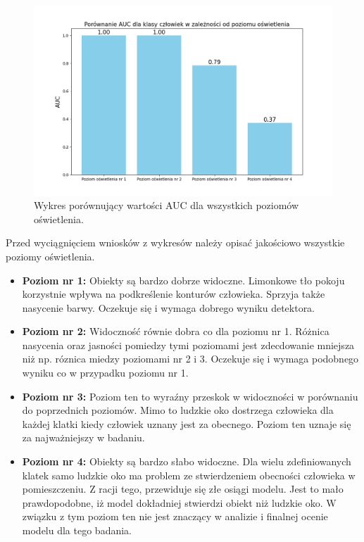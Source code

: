 \begin{figure}[H]
    \centering
    \includegraphics[width=\linewidth]{r_test_dokładności/AUC_charts/porownanieAUC.png}
    \caption{Wykres porównujący wartości AUC dla wszystkich poziomów oświetlenia.}
    \label{fig:AUC}
\end{figure}

Przed wyciągnięciem wniosków z wykresów należy opisać jakościowo wszystkie poziomy oświetlenia. 
\begin{itemize}
    \item \textbf{Poziom nr 1:} Obiekty są bardzo dobrze widoczne. Limonkowe tło pokoju korzystnie wpływa na podkreślenie konturów człowieka. Sprzyja także nasycenie barwy. Oczekuje się i wymaga dobrego wyniku detektora. 
    \item \textbf{Poziom nr 2:} Widoczność równie dobra co dla poziomu nr 1. Różnica nasycenia oraz jasności pomiedzy tymi poziomami jest zdecdowanie mniejsza niż np. róznica miedzy poziomami nr 2 i 3. Oczekuje się i wymaga podobnego wyniku co w przypadku poziomu nr 1.
    \item \textbf{Poziom nr 3:} Poziom ten to wyraźny przeskok w widoczności w porównaniu do poprzednich poziomów. Mimo to ludzkie oko dostrzega człowieka dla każdej klatki kiedy człowiek uznany jest za obecnego. Poziom ten uznaje się za najważniejszy w badaniu.
    \item \textbf{Poziom nr 4:} Obiekty są bardzo słabo widoczne. Dla wielu zdefiniowanych klatek samo ludzkie oko ma problem ze stwierdzeniem obecności człowieka w pomieszczeniu. Z racji tego, przewiduje się złe osiągi modelu. Jest to mało prawdopodobne, iż model dokładniej stwierdzi obiekt niż ludzkie oko. W związku z tym poziom ten nie jest znaczący w analizie i finalnej ocenie modelu dla tego badania. 
\end{itemize}


